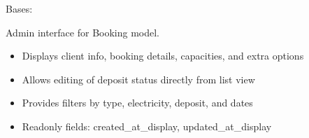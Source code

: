 \documentclass[letterpaper,10pt,english]{sphinxmanual}
\begin{document}

\begin{fulllineitems}
\label{\detokenize{index:bookings.admin.BookingAdmin}}
\pysigstartsignatures
\pysiglinewithargsret
{}
{\sphinxparamcomma {}}
{}
\pysigstopsignatures
\sphinxAtStartPar
Bases: 

\sphinxAtStartPar
Admin interface for Booking model.
\begin{itemize}
\item {} 
\sphinxAtStartPar
Displays client info, booking details, capacities, and extra options

\item {} 
\sphinxAtStartPar
Allows editing of deposit status directly from list view

\item {} 
\sphinxAtStartPar
Provides filters by type, electricity, deposit, and dates

\item {} 
\sphinxAtStartPar
Readonly fields: created\_at\_display, updated\_at\_display

\end{itemize}

\begin{fulllineitems}
\label{\detokenize{index:bookings.admin.BookingAdmin.list_display}}
\pysigstartsignatures
\pysigline
{}
\pysigstopsignatures
\end{fulllineitems}


\end{fulllineitems}
\end{document}
